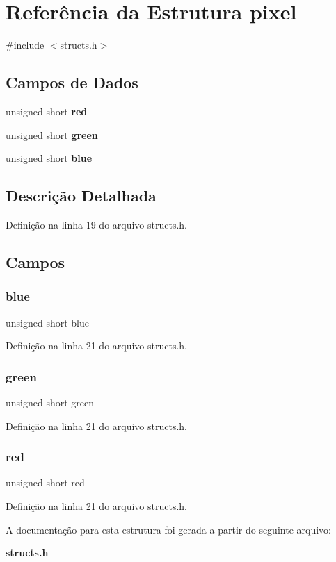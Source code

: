 \section{Referência da Estrutura pixel}
\label{structpixel}


{\ttfamily \#include $<$structs.\+h$>$}

\subsection*{Campos de Dados}
\begin{DoxyCompactItemize}
\item 
unsigned short \textbf{ red}
\item 
unsigned short \textbf{ green}
\item 
unsigned short \textbf{ blue}
\end{DoxyCompactItemize}


\subsection{Descrição Detalhada}


Definição na linha 19 do arquivo structs.\+h.



\subsection{Campos}
\mbox{\label{structpixel_a979e7337089fc93f096aef4f8608fef5}} 
\subsubsection{blue}
{\footnotesize\ttfamily unsigned short blue}



Definição na linha 21 do arquivo structs.\+h.

\mbox{\label{structpixel_a0dee4ece48d6a6eb6ab21fa87687369f}} 
\subsubsection{green}
{\footnotesize\ttfamily unsigned short green}



Definição na linha 21 do arquivo structs.\+h.

\mbox{\label{structpixel_ade5171ee009d0e897f977e5d476feb5e}} 
\subsubsection{red}
{\footnotesize\ttfamily unsigned short red}



Definição na linha 21 do arquivo structs.\+h.



A documentação para esta estrutura foi gerada a partir do seguinte arquivo\+:\begin{DoxyCompactItemize}
\item 
\textbf{ structs.\+h}\end{DoxyCompactItemize}
